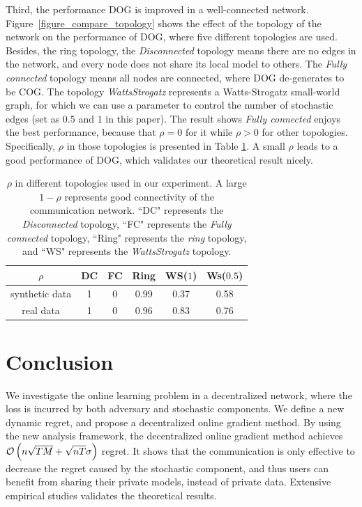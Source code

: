 \documentclass{article}
\begin{document}
Third, the performance DOG is improved in a well-connected network. Figure~\ref{figure_compare_topology} shows the effect of the topology of the network on the performance of DOG, where five different topologies are used. Besides, the ring topology, the \textit{Disconnected} topology means there are no edges in the network, and every node does not share its local model to others. The \textit{Fully connected} topology means all nodes are connected, where DOG de-generates to be COG. The topology  \textit{WattsStrogatz} represents a Watts-Strogatz small-world graph, for which we can use a parameter to control the number of stochastic edges (set as $0.5$ and $1$ in this paper). The result shows \textit{Fully connected} enjoys the best performance, because that $\rho = 0$ for it while $\rho>0$ for other topologies. Specifically, $\rho$ in those topologies is presented in Table \ref{table_rho}. A small $\rho$ leads to a good performance of DOG, which validates our theoretical result nicely. 


\begin{table}[!]
\begin{tabular}{c|c|c|c|c|c}
\hline
$\rho$    & DC & FC & Ring & WS($1$) &  Ws($0.5$) \\ \hline  \hline
synthetic data & 1            & 0               &   0.99   &       0.37            &  0.58 \\ \hline
real data     & 1            & 0               &    0.96   &          0.83         &  0.76 \\ \hline
\end{tabular}
\caption{$\rho$ in different topologies used in our experiment. A large $1-\rho$ represents good connectivity of the communication network. ``DC" represents the \textit{Disconnected} topology, ``FC" represents the \textit{Fully connected} topology, ``Ring" represents the \textit{ring} topology, and ``WS" represents the \textit{WattsStrogatz} topology.}
\label{table_rho}
\end{table}

 






\section{Conclusion}
We investigate the online learning problem in a decentralized network, where the loss is incurred by both adversary and stochastic components.  We define a new dynamic regret, and propose a decentralized online gradient method. By using the new analysis framework, the decentralized online gradient method  achieves ${\mathcal{O}\left( n\sqrt{TM} + \sqrt{nT}\sigma \right)}$ regret. It shows that the communication is only effective to decrease the regret caused by the stochastic component, and thus users can benefit from sharing their private models, instead of private data.  Extensive empirical studies validates the theoretical results. 
\end{document}
